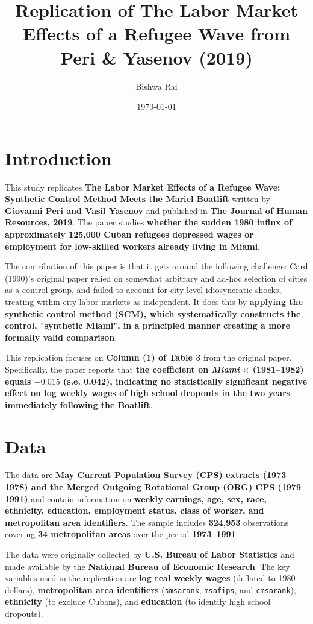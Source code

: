 \documentclass[12pt]{article}
\title{Replication of The Labor Market Effects of a Refugee Wave from Peri \& Yasenov (2019)}
\author{Bishwa Rai}
\date{\today}
\begin{document}
\maketitle
\thispagestyle{fancy}
\section{Introduction}

This study replicates \textbf{The Labor Market Effects of a Refugee Wave: Synthetic Control Method Meets the Mariel Boatlift} written by \textbf{Giovanni Peri and Vasil Yasenov} and published in \textbf{The Journal of Human Resources, 2019}. The paper studies \textbf{whether the sudden 1980 influx of approximately 125,000 Cuban refugees depressed wages or employment for low-skilled workers already living in Miami}.

The contribution of this paper is that it gets around the following challenge: Card (1990)'s original paper relied on somewhat arbitrary and ad-hoc selection of cities as a control group, and failed to account for city-level idiosyncratic shocks, treating within-city labor markets as independent. It does this by \textbf{applying the synthetic control method (SCM), which systematically constructs the control, "synthetic Miami", in a principled manner creating a more formally valid comparison}.

This replication focuses on \textbf{Column (1) of Table 3} from the original paper. Specifically, the paper reports that \textbf{the coefficient on \textit{Miami}
$\times$ (1981--1982) equals $\mathbf{-0.015}$ \textbf{(s.e. 0.042)}, indicating
no statistically significant negative effect on log weekly wages of high school
dropouts in the two years immediately following the Boatlift}.

\section{Data}

The data are \textbf{May Current Population Survey (CPS) extracts (1973--1978)
and the Merged Outgoing Rotational Group (ORG) CPS (1979--1991)} and contain information on \textbf{weekly earnings, age, sex, race, ethnicity, education, employment
status, class of worker, and metropolitan area identifiers}. The sample includes \textbf{324,953} observations covering \textbf{34 metropolitan areas} over the period \textbf{1973--1991}.

The data were originally collected by \textbf{U.S. Bureau of Labor Statistics} and made available by the \textbf{National Bureau of Economic Research}. The key variables used in the replication are \textbf{log real weekly wages} (deflated to 1980 dollars), \textbf{metropolitan
area identifiers} (\texttt{smsarank}, \texttt{msafips}, and \texttt{cmsarank}),
\textbf{ethnicity} (to exclude Cubans), and \textbf{education} (to identify
high school dropouts).
\end{document}
